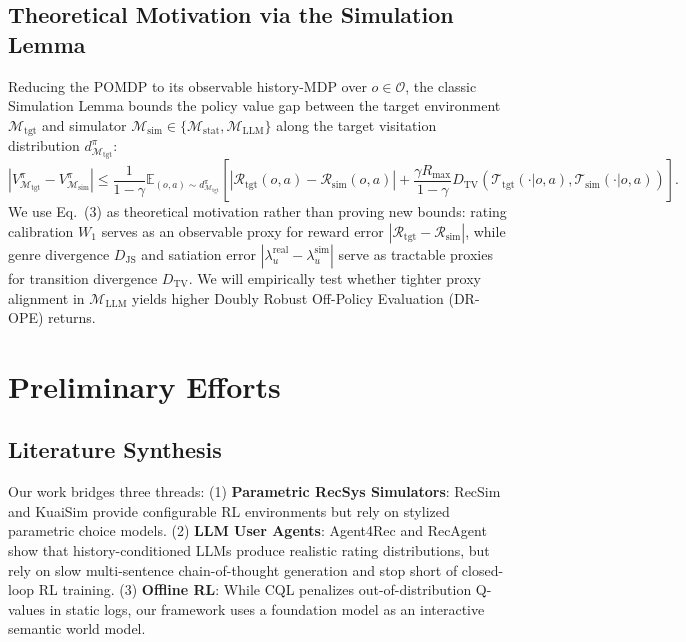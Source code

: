 \documentclass{article}
\begin{document}
\subsection{Theoretical Motivation via the Simulation Lemma}
Reducing the POMDP to its observable history-MDP over $o \in \mathcal{O}$, the classic Simulation Lemma \cite{kearns2002near} bounds the policy value gap between the target environment $\mathcal{M}_{\text{tgt}}$ and simulator $\mathcal{M}_{\text{sim}} \in \{\mathcal{M}_{\text{stat}}, \mathcal{M}_{\text{LLM}}\}$ along the target visitation distribution $d^{\pi}_{\mathcal{M}_{\text{tgt}}}$:
\begin{equation}
    \left| V^{\pi}_{\mathcal{M}_{\text{tgt}}} - V^{\pi}_{\mathcal{M}_{\text{sim}}} \right| \le \frac{1}{1-\gamma} \mathbb{E}_{(o,a) \sim d^{\pi}_{\mathcal{M}_{\text{tgt}}}} \left[ |\mathcal{R}_{\text{tgt}}(o,a) - \mathcal{R}_{\text{sim}}(o,a)| + \frac{\gamma R_{\max}}{1-\gamma} D_{\text{TV}}\left(\mathcal{T}_{\text{tgt}}(\cdot|o,a), \mathcal{T}_{\text{sim}}(\cdot|o,a)\right) \right].
\end{equation}
We use Eq.\ (3) as theoretical motivation rather than proving new bounds: rating calibration $W_1$ serves as an observable proxy for reward error $|\mathcal{R}_{\text{tgt}} - \mathcal{R}_{\text{sim}}|$, while genre divergence $D_{\text{JS}}$ and satiation error $|\lambda_u^{\text{real}} - \lambda_u^{\text{sim}}|$ serve as tractable proxies for transition divergence $D_{\text{TV}}$. We will empirically test whether tighter proxy alignment in $\mathcal{M}_{\text{LLM}}$ yields higher Doubly Robust Off-Policy Evaluation (DR-OPE) returns.

\section{Preliminary Efforts}

\subsection{Literature Synthesis}
Our work bridges three threads: (1) \textbf{Parametric RecSys Simulators}: RecSim \cite{ie2019recsim} and KuaiSim \cite{gao2022kuairec} provide configurable RL environments but rely on stylized parametric choice models. (2) \textbf{LLM User Agents}: Agent4Rec \cite{zhang2024agent4rec} and RecAgent \cite{wang2024user} show that history-conditioned LLMs produce realistic rating distributions, but rely on slow multi-sentence chain-of-thought generation and stop short of closed-loop RL training. (3) \textbf{Offline RL}: While CQL \cite{kumar2020conservative} penalizes out-of-distribution Q-values in static logs, our framework uses a foundation model as an interactive semantic world model.
\end{document}

